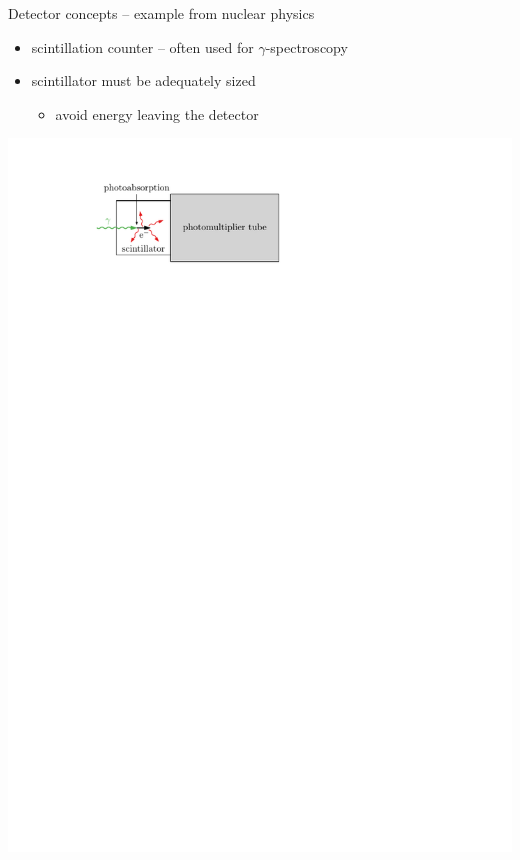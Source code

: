 \documentclass[11pt,xcolor=dvipsnames,professionalfonts]{beamer}
\begin{document}

\begin{frame}{Detector concepts -- example from nuclear physics}
	\begin{itemize}
		\setlength\itemsep{1.5em}
		\item scintillation counter -- often used for $\gamma$-spectroscopy
		
		\item scintillator must be adequately sized
		\begin{itemize}
			\item avoid energy leaving the detector
		\end{itemize}
	\end{itemize}
	\vfill
	\begin{center}
		\includegraphics{./figures/scintillation_counter.pdf}
	\end{center}
\end{frame}
\end{document}
